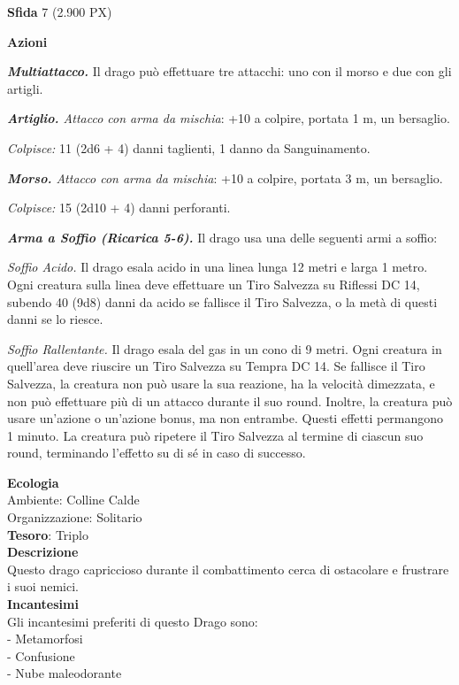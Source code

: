 \begin{multicols}{2}
\textbf{Sfida} 7 (2.900 PX)

\textbf{Azioni}

\textit{\textbf{Multiattacco.}} Il drago può effettuare tre attacchi: uno con il morso e due con gli artigli.

\textit{\textbf{Artiglio.} Attacco con arma da mischia}: +10 a colpire, portata 1 m, un bersaglio.

\textit{Colpisce:} 11 (2d6 + 4) danni taglienti, 1 danno da Sanguinamento.

\textit{\textbf{Morso.} Attacco con arma da mischia}: +10 a colpire, portata 3 m, un bersaglio.

\textit{Colpisce:} 15 (2d10 + 4) danni perforanti.

\textit{\textbf{Arma a Soffio (Ricarica 5-6).}} Il drago usa una delle seguenti armi a soffio:

\textit{Soffio Acido.} Il drago esala acido in una linea lunga 12 metri e larga 1 metro. Ogni creatura sulla linea deve effettuare un Tiro Salvezza su Riflessi DC 14, subendo 40 (9d8) danni da acido se fallisce il Tiro Salvezza, o la metà di questi danni se lo riesce.

\textit{Soffio Rallentante.} Il drago esala del gas in un cono di 9 metri. Ogni creatura in quell'area deve riuscire un Tiro Salvezza su Tempra DC 14. Se fallisce il Tiro Salvezza, la creatura non può usare la sua reazione, ha la velocità dimezzata, e non può effettuare più di un attacco durante il suo round. Inoltre, la creatura può usare un'azione o un'azione bonus, ma non entrambe. Questi effetti permangono 1 minuto. La creatura può ripetere il Tiro Salvezza al termine di ciascun suo round, terminando l'effetto su di sé in caso di successo.

\textbf{Ecologia}\\
Ambiente: Colline Calde\\
Organizzazione: Solitario\\
\textbf{Tesoro}: Triplo\\
\textbf{Descrizione}\\
Questo drago capriccioso durante il combattimento cerca di ostacolare e frustrare i suoi nemici.\\
\textbf{Incantesimi}\\
Gli incantesimi preferiti di questo Drago sono:\\
- Metamorfosi\\
- Confusione\\
- Nube maleodorante


\end{multicols}
